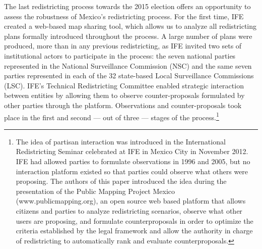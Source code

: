 \documentclass[letter,12pt]{article}
\begin{document}


The last redistricting process towards the 2015 election offers an opportunity to assess the robustness of Mexico's redistricting process. For the first time, IFE created a web-based map sharing tool, which allows us to analyze all redistricting plans formally introduced throughout the process. A large number of plans were produced, more than in any previous redistricting, as IFE invited two sets of institutional actors to participate in the process: the seven national parties represented in the National Surveillance Commission (NSC) and the same seven parties represented in each of the 32 state-based Local Surveillance Commissions (LSC). IFE’s Technical Redistricting Committee enabled strategic interaction between entities by allowing them to observe counter-proposals formulated by other parties through the platform. Observations and counter-proposals took place in the first and second --- out of three --- stages of the process.\footnote{The idea of partisan interaction was introduced in the International Redistricting Seminar celebrated at IFE in Mexico City in November 2012. IFE had allowed parties to formulate observations in 1996 and 2005, but no interaction platform existed so that parties could observe what others were proposing. The authors of this paper introduced the idea during the presentation of the Public Mapping Project Mexico (www.publicmapping.org), an open source web based platform that allows citizens and parties to analyze redistricting scenarios, observe what other users are proposing, and formulate counterproposals in order to optimize the criteria established by the legal framework and allow the authority in charge of redistricting to automatically rank and evaluate counterproposals.} 
\end{document}
